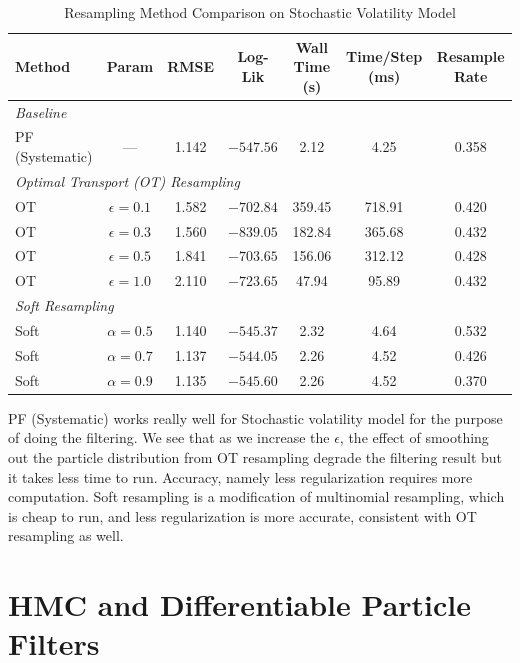 \documentclass{article}
\begin{document}
\begin{table}[htbp]
\centering
\caption{Resampling Method Comparison on Stochastic Volatility Model}
\begin{tabular}{lcccccc}
\toprule
\textbf{Method} & \textbf{Param} & \textbf{RMSE} & \textbf{Log-Lik} & \textbf{Wall Time (s)} & \textbf{Time/Step (ms)} & \textbf{Resample Rate} \\
\midrule
\multicolumn{7}{l}{\textit{Baseline}} \\
PF (Systematic) & ---    & 1.142 & $-547.56$ & 2.12  & 4.25  & 0.358 \\
\midrule
\multicolumn{7}{l}{\textit{Optimal Transport (OT) Resampling}} \\
OT              & $\epsilon=0.1$ & 1.582 & $-702.84$ & 359.45 & 718.91 & 0.420 \\
OT              & $\epsilon=0.3$ & 1.560 & $-839.05$ & 182.84 & 365.68 & 0.432 \\
OT              & $\epsilon=0.5$ & 1.841 & $-703.65$ & 156.06 & 312.12 & 0.428 \\
OT              & $\epsilon=1.0$ & 2.110 & $-723.65$ & 47.94  & 95.89  & 0.432 \\
\midrule
\multicolumn{7}{l}{\textit{Soft Resampling}} \\
Soft            & $\alpha=0.5$   & 1.140 & $-545.37$ & 2.32  & 4.64  & 0.532 \\
Soft            & $\alpha=0.7$   & 1.137 & $-544.05$ & 2.26  & 4.52  & 0.426 \\
Soft            & $\alpha=0.9$   & 1.135 & $-545.60$ & 2.26  & 4.52  & 0.370 \\
\bottomrule
\end{tabular}
\label{tab:stochastic_volatility_resampling}
\end{table}
PF (Systematic) works really well for Stochastic volatility model for the purpose of doing the filtering. We see that as we increase the $\epsilon$, the effect of smoothing out the particle distribution from OT resampling degrade the filtering result but it takes less time to run. Accuracy, namely less regularization requires more computation. Soft resampling is a modification of multinomial resampling, which is cheap to run, and less regularization is more accurate, consistent with OT resampling as well. 

\clearpage


\newpage
\section{HMC and Differentiable Particle Filters}
\end{document}
